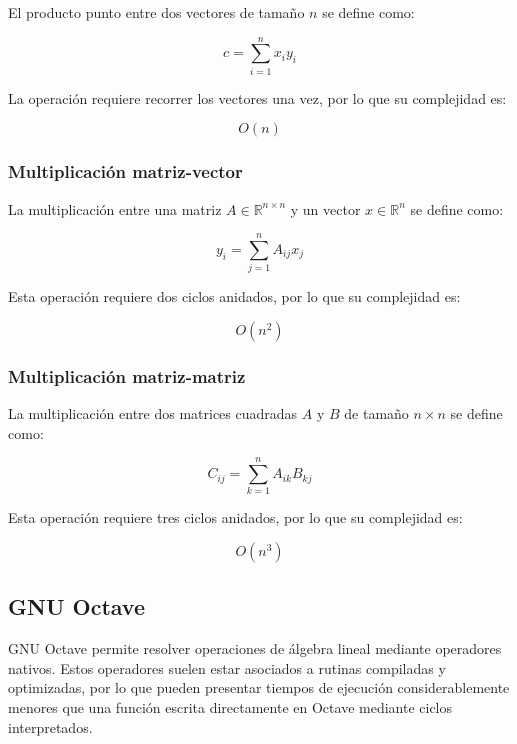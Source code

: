 \documentclass[12pt,letterpaper]{article}
\begin{document}
El producto punto entre dos vectores de tamaño $n$ se define como:

\begin{equation}
    c = \sum_{i=1}^{n} x_i y_i
\end{equation}

La operación requiere recorrer los vectores una vez, por lo que su complejidad es:

\begin{equation}
    O(n)
\end{equation}

\subsubsection{Multiplicación matriz-vector}

La multiplicación entre una matriz $A \in \mathbb{R}^{n \times n}$ y un vector $x \in \mathbb{R}^{n}$ se define como:

\begin{equation}
    y_i = \sum_{j=1}^{n} A_{ij}x_j
\end{equation}

Esta operación requiere dos ciclos anidados, por lo que su complejidad es:

\begin{equation}
    O(n^2)
\end{equation}

\subsubsection{Multiplicación matriz-matriz}

La multiplicación entre dos matrices cuadradas $A$ y $B$ de tamaño $n \times n$ se define como:

\begin{equation}
    C_{ij} = \sum_{k=1}^{n} A_{ik}B_{kj}
\end{equation}

Esta operación requiere tres ciclos anidados, por lo que su complejidad es:

\begin{equation}
    O(n^3)
\end{equation}

\subsection{GNU Octave}

GNU Octave permite resolver operaciones de álgebra lineal mediante operadores nativos. Estos operadores suelen estar asociados a rutinas compiladas y optimizadas, por lo que pueden presentar tiempos de ejecución considerablemente menores que una función escrita directamente en Octave mediante ciclos interpretados.
\end{document}
